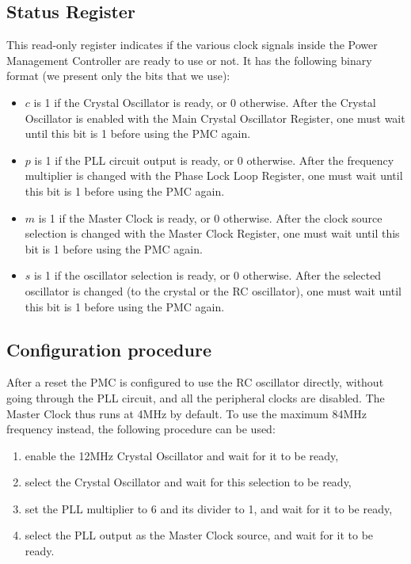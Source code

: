 \subsection{Status Register}

This read-only register indicates if the various clock signals inside the Power
Management Controller are ready to use or not. It has the following binary
format (we present only the bits that we use):

\begin{flushright}
\end{flushright}

\begin{itemize}
  \item $c$ is 1 if the Crystal Oscillator is ready, or 0 otherwise. After the
  Crystal Oscillator is enabled with the Main Crystal Oscillator Register, one
  must wait until this bit is 1 before using the PMC again.

  \item $p$ is 1 if the PLL circuit output is ready, or 0 otherwise. After the
  frequency multiplier is changed with the Phase Lock Loop Register, one must
  wait until this bit is 1 before using the PMC again.

  \item $m$ is 1 if the Master Clock is ready, or 0 otherwise. After the clock
  source selection is changed with the Master Clock Register, one must wait
  until this bit is 1 before using the PMC again.

  \item $s$ is 1 if the oscillator selection is ready, or 0 otherwise. After
  the selected oscillator is changed (to the crystal or the RC oscillator), one
  must wait until this bit is 1 before using the PMC again.
\end{itemize}

\subsection{Configuration procedure}\label{subsection:pmc-config}

After a reset the PMC is configured to use the RC oscillator directly, without
going through the PLL circuit, and all the peripheral clocks are disabled. The
Master Clock thus runs at 4MHz by default. To use the maximum 84MHz frequency
instead, the following procedure can be used:
\begin{enumerate}
  \item enable the 12MHz Crystal Oscillator and wait for it to be ready,

  \item select the Crystal Oscillator and wait for this selection to be ready,

  \item set the PLL multiplier to 6 and its divider to 1, and wait for it to be
  ready,

  \item select the PLL output as the Master Clock source, and wait for it to be
  ready.
\end{enumerate}

